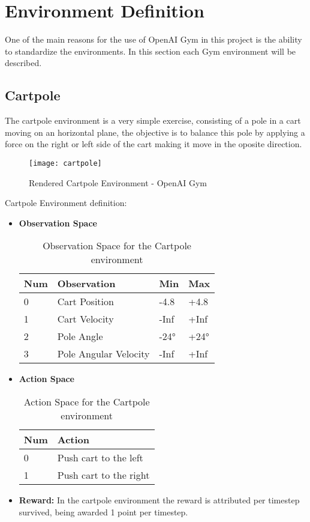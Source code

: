 \section{Environment Definition}
One of the main reasons for the use of OpenAI Gym in this project is the ability to standardize the environments.
In this section each Gym environment will be described.

\subsection{Cartpole}
The cartpole environment is a very simple exercise, consisting of a pole in a cart moving on an horizontal plane, 
the objective is to balance this pole by applying a force on the right or left side of the cart making it move in the oposite direction.
\cite{cartpole}

\begin{figure}[H]
    \centering
    \texttt{[image: cartpole]}
    \caption{Rendered Cartpole Environment - OpenAI Gym}
\end{figure}

Cartpole Environment definition:
\begin{itemize}
    \item \textbf{Observation Space}
            \begin{table}[H]
                \caption{Observation Space for the Cartpole environment}
                \centering
                \begin{tabular}{|l|l|l|l|}
                \hline
                Num & Observation           & Min  & Max  \\ \hline
                0   & Cart Position         & -4.8 & +4.8 \\ \hline
                1   & Cart Velocity         & -Inf & +Inf \\ \hline
                2   & Pole Angle            & -24° & +24° \\ \hline
                3   & Pole Angular Velocity & -Inf & +Inf \\ \hline
                \end{tabular}
                \end{table}
    \item \textbf{Action Space} 
    \begin{table}[H]
        \caption{Action Space for the Cartpole environment}
        \centering
        \begin{tabular}{|l|l|}
        \hline
        Num & Action                 \\ \hline
        0   & Push cart to the left  \\ \hline
        1   & Push cart to the right \\ \hline
        \end{tabular}
        \end{table}
    \item \textbf{Reward:} In the cartpole environment the reward is attributed per timestep survived, being awarded 1 point per timestep.
    \end{itemize} 

